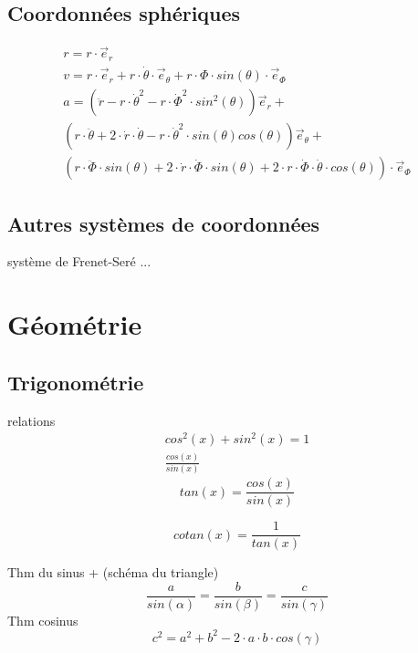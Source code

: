 \subsection{Coordonnées sphériques}

\begin{eqnarray}
r=r \cdot \vec{e}_r\\
v=r \cdot \vec{e}_{r} + r \cdot \dot{\theta}\cdot \vec{e}_{\theta}+r \cdot \Phi\cdot sin(\theta) \cdot \vec{e}_{\Phi}\\
a=(\ddot{r}-r \cdot \dot{\theta}^2-r\cdot \dot{\Phi}^2 \cdot sin^2(\theta))\vec{e}_{r}+\\
(r \cdot \ddot{\theta}+2 \cdot \dot{r}\cdot \dot{\theta}-r\cdot \dot{\theta}^2 \cdot sin(\theta)cos(\theta))\vec{e}_{\theta}+\\
(r \cdot \ddot{\Phi} \cdot sin(\theta)+2 \cdot \dot{r} \cdot \dot{\Phi} \cdot sin(\theta)+2 \cdot r \cdot \dot{\Phi} \cdot \dot{\theta} \cdot cos(\theta))\cdot \vec{e}_{\Phi}
\end{eqnarray}

\subsection{Autres systèmes de coordonnées}
système de Frenet-Seré
...
\newpage
\section{Géométrie}



\subsection{Trigonométrie}
relations
\begin{eqnarray}
cos^2(x)+sin^2(x)=1\\
\frac{cos(x)}{sin(x)}
\end{eqnarray}
\begin{equation}
tan(x)=\frac{cos(x)}{sin(x)}
\end{equation}

\begin{equation}
cotan(x)=\frac{1}{tan(x)}
\end{equation}

Thm du sinus + (schéma du triangle)
\begin{equation}
\frac{a}{sin(\alpha)}=\frac{b}{sin(\beta)}=\frac{c}{sin(\gamma)}
\end{equation}
Thm cosinus
\begin{equation}
c^2=a^2+b^2-2 \cdot a \cdot b \cdot cos(\gamma)
\end{equation}

